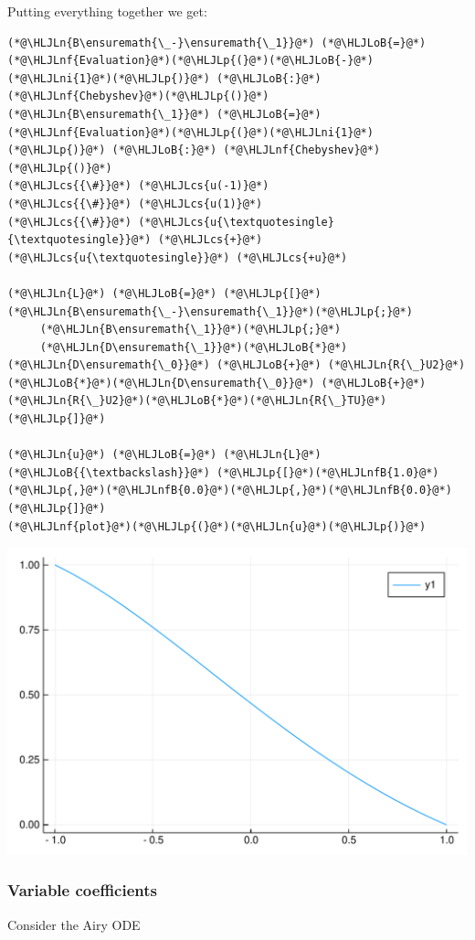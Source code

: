 \documentclass[12pt,a4paper]{article}
\newcommand{\HLJLn}[1]{#1}
\newcommand{\HLJLnf}[1]{\textcolor[RGB]{66,102,213}{#1}}
\newcommand{\HLJLnfB}[1]{\textcolor[RGB]{59,151,46}{#1}}
\newcommand{\HLJLni}[1]{\textcolor[RGB]{59,151,46}{#1}}
\newcommand{\HLJLoB}[1]{\textcolor[RGB]{102,102,102}{\textbf{#1}}}
\newcommand{\HLJLp}[1]{#1}
\newcommand{\HLJLcs}[1]{\textcolor[RGB]{153,153,119}{\textit{#1}}}
\begin{document}
Putting everything together we get:


\begin{lstlisting}
(*@\HLJLn{B\ensuremath{\_-}\ensuremath{\_1}}@*) (*@\HLJLoB{=}@*) (*@\HLJLnf{Evaluation}@*)(*@\HLJLp{(}@*)(*@\HLJLoB{-}@*)(*@\HLJLni{1}@*)(*@\HLJLp{)}@*) (*@\HLJLoB{:}@*) (*@\HLJLnf{Chebyshev}@*)(*@\HLJLp{()}@*)
(*@\HLJLn{B\ensuremath{\_1}}@*) (*@\HLJLoB{=}@*) (*@\HLJLnf{Evaluation}@*)(*@\HLJLp{(}@*)(*@\HLJLni{1}@*)(*@\HLJLp{)}@*) (*@\HLJLoB{:}@*) (*@\HLJLnf{Chebyshev}@*)(*@\HLJLp{()}@*)
(*@\HLJLcs{{\#}}@*) (*@\HLJLcs{u(-1)}@*) 
(*@\HLJLcs{{\#}}@*) (*@\HLJLcs{u(1)}@*)
(*@\HLJLcs{{\#}}@*) (*@\HLJLcs{u{\textquotesingle}{\textquotesingle}}@*) (*@\HLJLcs{+}@*) (*@\HLJLcs{u{\textquotesingle}}@*) (*@\HLJLcs{+u}@*)

(*@\HLJLn{L}@*) (*@\HLJLoB{=}@*) (*@\HLJLp{[}@*)(*@\HLJLn{B\ensuremath{\_-}\ensuremath{\_1}}@*)(*@\HLJLp{;}@*) 
     (*@\HLJLn{B\ensuremath{\_1}}@*)(*@\HLJLp{;}@*) 
     (*@\HLJLn{D\ensuremath{\_1}}@*)(*@\HLJLoB{*}@*)(*@\HLJLn{D\ensuremath{\_0}}@*) (*@\HLJLoB{+}@*) (*@\HLJLn{R{\_}U2}@*)(*@\HLJLoB{*}@*)(*@\HLJLn{D\ensuremath{\_0}}@*) (*@\HLJLoB{+}@*) (*@\HLJLn{R{\_}U2}@*)(*@\HLJLoB{*}@*)(*@\HLJLn{R{\_}TU}@*)(*@\HLJLp{]}@*)

(*@\HLJLn{u}@*) (*@\HLJLoB{=}@*) (*@\HLJLn{L}@*) (*@\HLJLoB{{\textbackslash}}@*) (*@\HLJLp{[}@*)(*@\HLJLnfB{1.0}@*)(*@\HLJLp{,}@*)(*@\HLJLnfB{0.0}@*)(*@\HLJLp{,}@*)(*@\HLJLnfB{0.0}@*)(*@\HLJLp{]}@*)
(*@\HLJLnf{plot}@*)(*@\HLJLp{(}@*)(*@\HLJLn{u}@*)(*@\HLJLp{)}@*)
\end{lstlisting}

\includegraphics[width=\linewidth]{figures/Lecture22_14_1.pdf}

\subsubsection{Variable coefficients}
Consider the Airy ODE 
\end{document}
